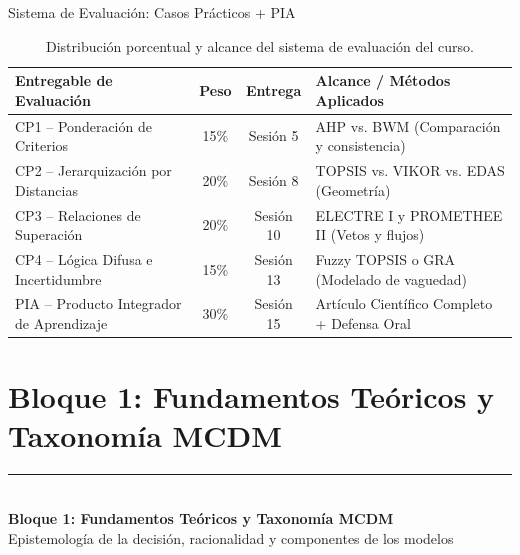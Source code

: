 \documentclass[aspectratio=169, 10pt]{beamer}
\begin{document}
\begin{frame}{Sistema de Evaluación: Casos Prácticos + PIA}
    \begin{table}
        \centering
        \scriptsize
        \begin{tabular}{lccl}
            \toprule
            \textbf{Entregable de Evaluación} & \textbf{Peso} & \textbf{Entrega} & \textbf{Alcance / Métodos Aplicados} \\
            \midrule
            CP1 -- Ponderación de Criterios & 15\% & Sesión 5 & AHP vs. BWM (Comparación y consistencia) \\
            CP2 -- Jerarquización por Distancias & 20\% & Sesión 8 & TOPSIS vs. VIKOR vs. EDAS (Geometría) \\
            CP3 -- Relaciones de Superación & 20\% & Sesión 10 & ELECTRE I y PROMETHEE II (Vetos y flujos) \\
            CP4 -- Lógica Difusa e Incertidumbre & 15\% & Sesión 13 & Fuzzy TOPSIS o GRA (Modelado de vaguedad) \\
            PIA -- Producto Integrador de Aprendizaje & 30\% & Sesión 15 & Artículo Científico Completo + Defensa Oral \\
            \bottomrule
        \end{tabular}
        \caption{Distribución porcentual y alcance del sistema de evaluación del curso.}
    \end{table}
\end{frame}

\section{Bloque 1: Fundamentos Teóricos y Taxonomía MCDM}
\begingroup
{}
\begin{frame}[plain]
    \vfill
    \hspace{0.08\paperwidth}%
    {\color{UANLgold}\rule{4cm}{2pt}}\\[8pt]%
    \hspace{0.08\paperwidth}%
    {\color{FIMEwhite}\LARGE\rmfamily\bfseries Bloque 1: Fundamentos Teóricos y Taxonomía MCDM}\\[6pt]
    \hspace{0.08\paperwidth}%
    {\color{FIMEwhite!85}\large\sffamily Epistemología de la decisión, racionalidad y componentes de los modelos}
    \vfill
\end{frame}
\endgroup
\end{document}
